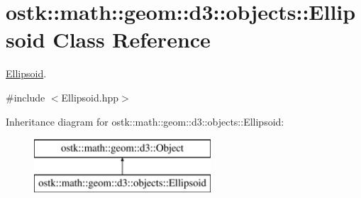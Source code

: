 \hypertarget{classostk_1_1math_1_1geom_1_1d3_1_1objects_1_1_ellipsoid}{}\section{ostk\+:\+:math\+:\+:geom\+:\+:d3\+:\+:objects\+:\+:Ellipsoid Class Reference}
\label{classostk_1_1math_1_1geom_1_1d3_1_1objects_1_1_ellipsoid}


\hyperlink{classostk_1_1math_1_1geom_1_1d3_1_1objects_1_1_ellipsoid}{Ellipsoid}.  




{\ttfamily \#include $<$Ellipsoid.\+hpp$>$}

Inheritance diagram for ostk\+:\+:math\+:\+:geom\+:\+:d3\+:\+:objects\+:\+:Ellipsoid\+:\begin{figure}[H]
\begin{center}
\leavevmode
\includegraphics[height=2.000000cm]{classostk_1_1math_1_1geom_1_1d3_1_1objects_1_1_ellipsoid}
\end{center}
\end{figure}
